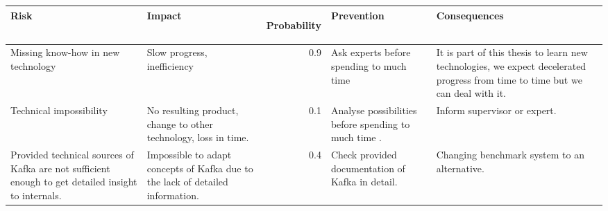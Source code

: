\begin{tabular}[t]{|p{3cm}|p{3cm}|r|p{3cm}|p{3cm}|}\hline
\textbf{Risk} &
    \textbf{Impact} &
  \begin{sideways} \textbf{Probability } \end{sideways} &
  \textbf{Prevention} & \textbf{Consequences} \\ \hline
    Missing know-how in new technology & 
    Slow progress, inefficiency & 
    0.9 & 
    Ask experts before spending to much time & 
    It is part of this thesis to learn new technologies, we expect decelerated
    progress from time to time but we can deal with it. \\ \hline
  Technical impossibility & 
    No resulting product, change to other technology, loss in time. & 
    0.1 & 
    Analyse possibilities before spending to much time . &
    Inform supervisor or expert. \\\hline
    Provided technical sources of Kafka are not sufficient enough to get
    detailed insight to internals. & Impossible to adapt concepts of Kafka due to the lack of
    detailed information. &
    0.4 
    & Check provided documentation of Kafka in detail. &
    Changing benchmark system to an alternative. 
    \\ \hline
\end{tabular}
\label{tab:Risiken}






